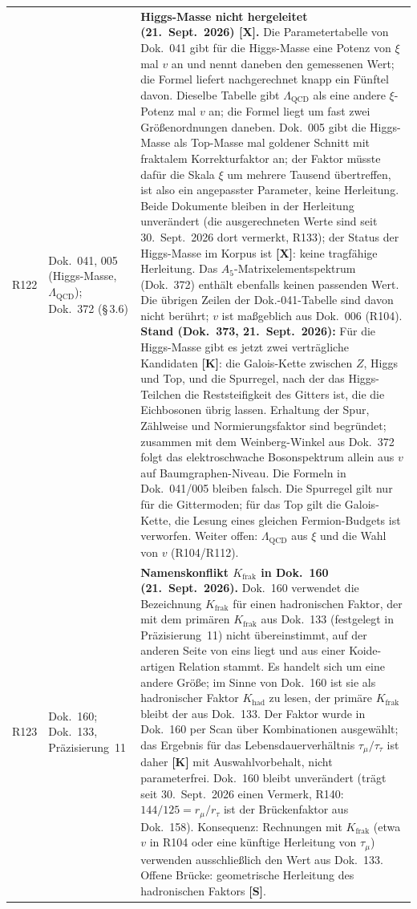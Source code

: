 \begin{longtable}{@{}p{0.9cm}p{3.1cm}p{10.2cm}@{}}
R122 & Dok.~041, 005 (Higgs-Masse, $\Lambda_{\mathrm{QCD}}$); Dok.~372 (§\,3.6) & \textbf{Higgs-Masse nicht hergeleitet (21.~Sept.~2026) [X].} Die Parametertabelle von Dok.~041 gibt für die Higgs-Masse eine Potenz von $\xi$ mal $v$ an und nennt daneben den gemessenen Wert; die Formel liefert nachgerechnet knapp ein Fünftel davon. Dieselbe Tabelle gibt $\Lambda_{\mathrm{QCD}}$ als eine andere $\xi$-Potenz mal $v$ an; die Formel liegt um fast zwei Größenordnungen daneben. Dok.~005 gibt die Higgs-Masse als Top-Masse mal goldener Schnitt mit fraktalem Korrekturfaktor an; der Faktor müsste dafür die Skala $\xi$ um mehrere Tausend übertreffen, ist also ein angepasster Parameter, keine Herleitung. Beide Dokumente bleiben in der Herleitung unverändert (die ausgerechneten Werte sind seit 30.~Sept.~2026 dort vermerkt, R133); der Status der Higgs-Masse im Korpus ist \textbf{[X]}: keine tragfähige Herleitung. Das $A_5$-Matrixelementspektrum (Dok.~372) enthält ebenfalls keinen passenden Wert. Die übrigen Zeilen der Dok.-041-Tabelle sind davon nicht berührt; $v$ ist maßgeblich aus Dok.~006 (R104). \textbf{Stand (Dok.~373, 21.~Sept.~2026):} Für die Higgs-Masse gibt es jetzt zwei verträgliche Kandidaten \textbf{[K]}: die Galois-Kette zwischen $Z$, Higgs und Top, und die Spurregel, nach der das Higgs-Teilchen die Reststeifigkeit des Gitters ist, die die Eichbosonen übrig lassen. Erhaltung der Spur, Zählweise und Normierungsfaktor sind begründet; zusammen mit dem Weinberg-Winkel aus Dok.~372 folgt das elektroschwache Bosonspektrum allein aus $v$ auf Baumgraphen-Niveau. Die Formeln in Dok.~041/005 bleiben falsch. Die Spurregel gilt nur für die Gittermoden; für das Top gilt die Galois-Kette, die Lesung eines gleichen Fermion-Budgets ist verworfen. Weiter offen: $\Lambda_{\mathrm{QCD}}$ aus $\xi$ und die Wahl von $v$ (R104/R112). \\
R123 & Dok.~160; Dok.~133, Präzisierung~11 & \textbf{Namenskonflikt $K_{\mathrm{frak}}$ in Dok.~160 (21.~Sept.~2026).} Dok.~160 verwendet die Bezeichnung $K_{\mathrm{frak}}$ für einen hadronischen Faktor, der mit dem primären $K_{\mathrm{frak}}$ aus Dok.~133 (festgelegt in Präzisierung~11) nicht übereinstimmt, auf der anderen Seite von eins liegt und aus einer Koide-artigen Relation stammt. Es handelt sich um eine andere Größe; im Sinne von Dok.~160 ist sie als hadronischer Faktor $K_{\mathrm{had}}$ zu lesen, der primäre $K_{\mathrm{frak}}$ bleibt der aus Dok.~133. Der Faktor wurde in Dok.~160 per Scan über Kombinationen ausgewählt; das Ergebnis für das Lebensdauerverhältnis $\tau_\mu/\tau_\tau$ ist daher \textbf{[K]} mit Auswahlvorbehalt, nicht parameterfrei. Dok.~160 bleibt unverändert (trägt seit 30.~Sept.~2026 einen Vermerk, R140: $144/125=r_\mu/r_\tau$ ist der Brückenfaktor aus Dok.~158). Konsequenz: Rechnungen mit $K_{\mathrm{frak}}$ (etwa $v$ in R104 oder eine künftige Herleitung von $\tau_\mu$) verwenden ausschließlich den Wert aus Dok.~133. Offene Brücke: geometrische Herleitung des hadronischen Faktors \textbf{[S]}. \\

\end{longtable}

